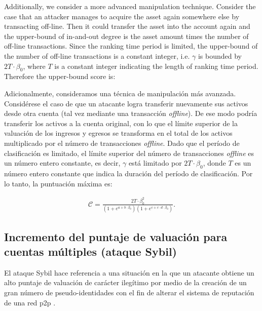 Additionally, we consider a more advanced manipulation technique. Consider the case that an attacker manages to acquire the asset again somewhere else by transacting off-line. Then it could transfer the asset into the account again and the upper-bound of in-and-out degree is the asset amount times the number of off-line transactions. Since the ranking time period is limited, the upper-bound of the number of off-line transactions is a constant integer, i.e. $\gamma$ is bounded by $2T \cdot \beta_0$, where $T$ is a constant integer indicating the length of ranking time period. Therefore the upper-bound score is:

Adicionalmente, consideramos una técnica de manipulación más avanzada. Considérese el caso de que un atacante logra transferir nuevamente sus activos desde otra cuenta (tal vez mediante una transacción \textit{offline}). De ese modo podría transferir los activos a la cuenta original, con lo que el límite superior de la valuación de los ingresos y egresos se transforma en el total de los activos multiplicado por el número de transacciones \textit{offline}. Dado que el período de clasificación es limitado, el límite superior del número de transacciones \textit{offline} es un número entero constante, es decir, $\gamma$ está limitado por $2T \cdot \beta_0$, donde $T$ es un número entero constante que indica la duración del período de clasificación. Por lo tanto, la puntuación máxima es:

\begin{align}
  \mathcal{C} =  \frac{2T \cdot \beta_0 ^2}{ (1+e^{a + b \cdot \beta_0})
  (1+e^{c + c \cdot d \cdot \beta_0})}.
\end{align}

\subsection{Incremento del puntaje de valuación para cuentas múltiples (ataque Sybil)}
El ataque Sybil hace referencia a una situación en la que un atacante obtiene un alto puntaje de valuación de carácter ilegítimo por medio de la creación de un gran número de pseudo-identidades con el fin de alterar el sistema de reputación de una red p2p \cite{quercia2010sybil}.

